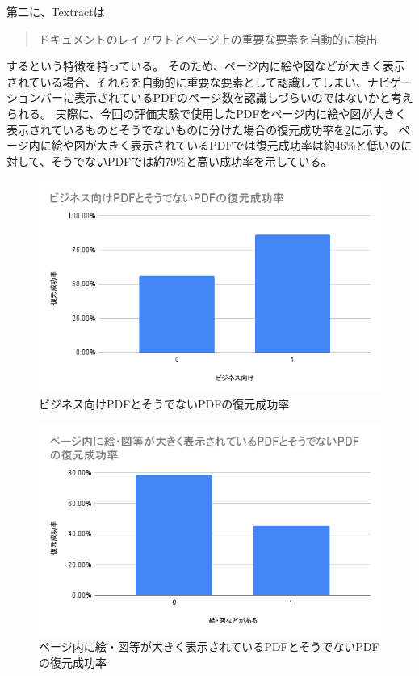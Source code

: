 第二に、Textractは
\begin{quote}
ドキュメントのレイアウトとページ上の重要な要素を自動的に検出
\end{quote}
するという特徴を持っている。
そのため、ページ内に絵や図などが大きく表示されている場合、それらを自動的に重要な要素として認識してしまい、ナビゲーションバーに表示されているPDFのページ数を認識しづらいのではないかと考えられる。
実際に、今回の評価実験で使用したPDFをページ内に絵や図が大きく表示されているものとそうでないものに分けた場合の復元成功率を\ref{fig:success-rate-figure-or-not-pdf}に示す。
ページ内に絵や図が大きく表示されているPDFでは復元成功率は約46\%と低いのに対して、そうでないPDFでは約79\%と高い成功率を示している。

\begin{figure}[htbp]
  \caption{ビジネス向けPDFとそうでないPDFの復元成功率}
  \label{fig:success-rate-business-or-not-pdf}
  \begin{center}
    \includegraphics[bb=0 0 600 371,width=15cm]{img/060_evaluation/consideration/pdf/success-rate-business-or-not-pdf.pdf}
  \end{center}
\end{figure}

\begin{figure}[htbp]
  \caption{ページ内に絵・図等が大きく表示されているPDFとそうでないPDFの復元成功率}
  \label{fig:success-rate-figure-or-not-pdf}
  \begin{center}
    \includegraphics[bb=0 0 600 371,width=15cm]{img/060_evaluation/consideration/pdf/success-rate-figure-or-not-pdf.pdf}
  \end{center}
\end{figure}

